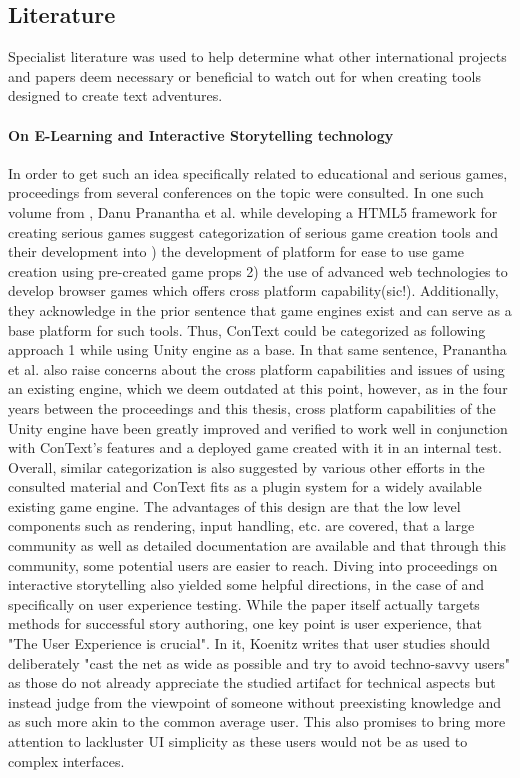 \subsection{Literature}
Specialist literature was used to help determine what other international projects and papers deem necessary or beneficial to watch out for when creating tools designed to create text adventures. 
\paragraph{On E-Learning and Interactive Storytelling technology}
In order to get such an idea specifically related to educational and serious games, proceedings from several conferences on the topic were consulted. In one such volume from \cite{ELEARN}, Danu Pranantha et al. while developing a HTML5 framework for creating serious games suggest categorization of serious game creation tools and their development into ) the development of platform for ease to use game creation using pre-created game props 2) the use of advanced web technologies to develop browser games which offers cross platform capability\grqq (sic!)\cite{ELEARN1}. Additionally, they acknowledge in the prior sentence that game engines exist and can serve as a base platform for such tools. Thus, ConText could be categorized as following approach 1 while using Unity engine as a base. In that same sentence, Pranantha et al. also raise concerns about the cross platform capabilities and issues of using an existing engine, which we deem outdated at this point, however, as in the four years between the proceedings and this thesis, cross platform capabilities of the Unity engine have been greatly improved and verified to work well in conjunction with ConText's features and a deployed game created with it in an internal test. Overall, similar categorization is also suggested by various other efforts in the consulted material and ConText fits as a plugin system for a widely available existing game engine. The advantages of this design are that the low level components such as rendering, input handling, etc. are covered, that a large community as well as detailed documentation are available and that through this community, some potential users are easier to reach. 
Diving into proceedings on interactive storytelling also yielded some helpful directions, in the case of \cite{ISTORY} and \cite{ISTORY1} specifically on user experience testing. While the paper itself actually targets methods for successful story authoring, one key point is user experience, that "The User Experience is crucial". In it, Koenitz writes that user studies should deliberately "cast the net as wide as possible and try to avoid techno-savvy users"\cite[p.~135]{ISTORY} as those do not already appreciate the studied artifact for technical aspects but instead judge from the viewpoint of someone without preexisting knowledge and as such more akin to the common average user. This also promises to bring more attention to lackluster UI simplicity as these users would not be as used to complex interfaces.

